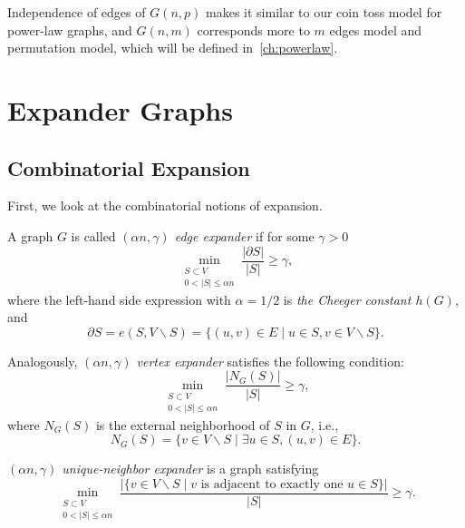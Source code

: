 Independence of edges of $G(n,p)$ makes it similar to our coin toss model for power-law graphs,
and $G(n,m)$ corresponds more to $m$ edges model and permutation model,
which will be defined in~\autoref{ch:powerlaw}.

\section{Expander Graphs}

\subsection{Combinatorial Expansion}

First, we look at the combinatorial notions of expansion.

\begin{definition}
    A graph $G$ is called \textit{$(\alpha n,\gamma)$ edge expander} if for some $\gamma>0$
    \begin{equation}
        \min_{\substack{S\subset V\\0<|S|\leq\alpha n}}\frac{|\partial S|}{|S|}\geq\gamma,
    \end{equation}
    where the left-hand side expression with $\alpha=1/2$ is \textit{the Cheeger constant $h(G)$}, and
    \begin{equation}
        \partial S=e(S,V\backslash S)=\{(u,v)\in E\;|\;u\in S,v\in V\backslash S\}.
    \end{equation}
\end{definition}

\begin{definition}
    Analogously, \textit{$(\alpha n,\gamma)$ vertex expander} satisfies the following condition:
    \begin{equation}
        \min_{\substack{S\subset V\\0<|S|\leq\alpha n}}\frac{|N_G(S)|}{|S|}\geq\gamma,
    \end{equation}
    where $N_G(S)$ is the external neighborhood of $S$ in $G$, i.e.,
    \begin{equation}
        N_G(S)=\{v\in V\backslash S\;|\;\exists u\in S, (u,v)\in E\}.
    \end{equation}
\end{definition}

\begin{definition}
    \textit{$(\alpha n,\gamma)$ unique-neighbor expander} is a graph satisfying
    \begin{equation}
        \min_{\substack{S\subset V\\0<|S|\leq\alpha n}}
        \frac{|\{v\in V\backslash S\;|\;v\text{ is adjacent to exactly one }u\in S\}|}{|S|}\geq\gamma.
    \end{equation}
\end{definition}

